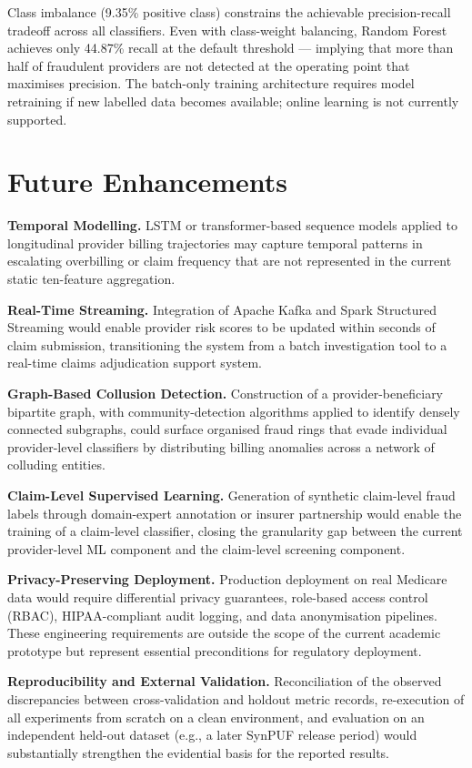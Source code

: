 Class imbalance (9.35\% positive class) constrains the achievable precision-recall tradeoff across all classifiers. Even with class-weight balancing, Random Forest achieves only 44.87\% recall at the default threshold --- implying that more than half of fraudulent providers are not detected at the operating point that maximises precision. The batch-only training architecture requires model retraining if new labelled data becomes available; online learning is not currently supported.

\section{Future Enhancements}

\textbf{Temporal Modelling.} LSTM or transformer-based sequence models applied to longitudinal provider billing trajectories may capture temporal patterns in escalating overbilling or claim frequency that are not represented in the current static ten-feature aggregation.

\textbf{Real-Time Streaming.} Integration of Apache Kafka and Spark Structured Streaming would enable provider risk scores to be updated within seconds of claim submission, transitioning the system from a batch investigation tool to a real-time claims adjudication support system.

\textbf{Graph-Based Collusion Detection.} Construction of a provider-beneficiary bipartite graph, with community-detection algorithms applied to identify densely connected subgraphs, could surface organised fraud rings that evade individual provider-level classifiers by distributing billing anomalies across a network of colluding entities.

\textbf{Claim-Level Supervised Learning.} Generation of synthetic claim-level fraud labels through domain-expert annotation or insurer partnership would enable the training of a claim-level classifier, closing the granularity gap between the current provider-level ML component and the claim-level screening component.

\textbf{Privacy-Preserving Deployment.} Production deployment on real Medicare data would require differential privacy guarantees, role-based access control (RBAC), HIPAA-compliant audit logging, and data anonymisation pipelines. These engineering requirements are outside the scope of the current academic prototype but represent essential preconditions for regulatory deployment.

\textbf{Reproducibility and External Validation.} Reconciliation of the observed discrepancies between cross-validation and holdout metric records, re-execution of all experiments from scratch on a clean environment, and evaluation on an independent held-out dataset (e.g., a later SynPUF release period) would substantially strengthen the evidential basis for the reported results.

